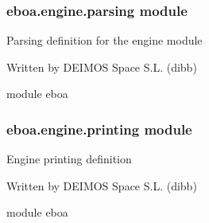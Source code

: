 \subsubsection{eboa.engine.parsing module}
\label{\detokenize{eboa.engine:module-eboa.engine.parsing}}\label{\detokenize{eboa.engine:eboa-engine-parsing-module}}
Parsing definition for the engine module

Written by DEIMOS Space S.L. (dibb)

module eboa

\begin{fulllineitems}
\label{\detokenize{eboa.engine:eboa.engine.parsing.validate_data_dictionary}}
\end{fulllineitems}


\begin{fulllineitems}
\label{\detokenize{eboa.engine:eboa.engine.parsing.validate_values}}
\end{fulllineitems}



\subsubsection{eboa.engine.printing module}
\label{\detokenize{eboa.engine:module-eboa.engine.printing}}\label{\detokenize{eboa.engine:eboa-engine-printing-module}}
Engine printing definition

Written by DEIMOS Space S.L. (dibb)

module eboa

